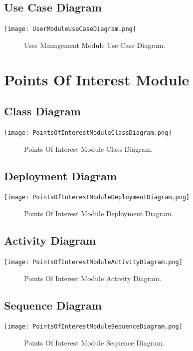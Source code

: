 \documentclass[12pt]{article}
\begin{document}
	\subsection{Use Case Diagram}
        	\texttt{[image: UserModuleUseCaseDiagram.png]}
        	\begin{figure}[h]
        		\caption{User Management Module Use Case Diagram.}
        	\end{figure}
        	
   
   \section{Points Of Interest Module}
	
	\subsection{Class Diagram}
        \texttt{[image: PointsOfInterestModuleClassDiagram.png]}
        \begin{figure}[h]
            \caption{Points Of Interest Module Class Diagram.}
        \end{figure}
    
    \subsection{Deployment Diagram}
        \texttt{[image: PointsOfInterestModuleDeploymentDiagram.png]}
        \begin{figure}[h]
            \caption{Points Of Interest Module Deployment Diagram.}
        \end{figure}
        
    \subsection{Activity Diagram}
        \texttt{[image: PointsOfInterestModuleActivityDiagram.png]}
        \begin{figure}[h]
            \caption{Points Of Interest Module Activity Diagram.}
        \end{figure}

    \subsection{Sequence Diagram}
        \texttt{[image: PointsOfInterestModuleSequenceDiagram.png]}
        \begin{figure}[h]
            \caption{Points Of Interest Module Sequence Diagram.}
        \end{figure}
\end{document}
